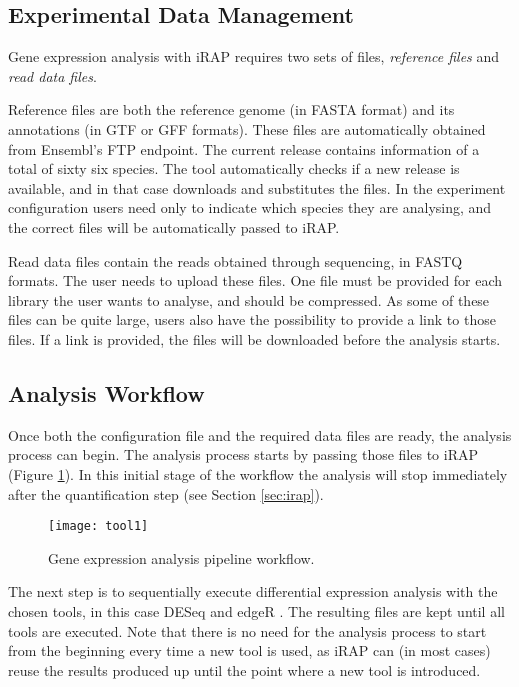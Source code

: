 \subsection{Experimental Data Management}

Gene expression analysis with iRAP requires two sets of files, \emph{reference
files} and \emph{read data files}.

Reference files are both the reference genome (in FASTA format) and its
annotations (in GTF or GFF formats). These files are automatically obtained from
Ensembl's FTP endpoint. The current release contains information of a total of
sixty six species. The tool automatically checks if a new release is available,
and in that case downloads and substitutes the files. In the experiment
configuration users need only to indicate which species they are analysing, and
the correct files will be automatically passed to iRAP.

Read data files contain the reads obtained through sequencing, in FASTQ formats.
The user needs to upload these files. One file must be provided for each library
the user wants to analyse, and should be compressed. As some of these files can
be quite large, users also have the possibility to provide a link to those
files. If a link is provided, the files will be downloaded before the analysis
starts.

\subsection{Analysis Workflow}\label{sec:descworkflow}

Once both the configuration file and the required data files are ready, the
analysis process can begin. The analysis process starts by passing those files
to iRAP (Figure \ref{fig:tool1}). In this initial stage of the workflow the
analysis will stop immediately after the quantification step (see Section
\ref{sec:irap}).

\begin{figure}[!htb]
  \begin{center}
    \leavevmode
    \texttt{[image: tool1]}
    \caption[Gene expression analysis pipeline workflow]{
      Gene expression analysis pipeline workflow.
    }
    \label{fig:tool1}
  \end{center}
\end{figure}

The next step is to sequentially execute differential expression analysis with
the chosen tools, in this case DESeq \cite{20979621} and edgeR
\cite{robinson2010edger}. The resulting files are kept until all tools are
executed. Note that there is no need for the analysis process to start from the
beginning every time a new tool is used, as iRAP can (in most cases) reuse the
results produced up until the point where a new tool is introduced.

